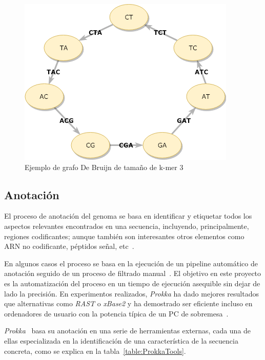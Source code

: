 \begin{figure}
    \begin{center}
      \includegraphics[scale=0.5]{images/DeBruijnGraph.png}
      \caption{Ejemplo de grafo De Bruijn de tamaño de  k-mer 3}
      \label{fig:DeBruijn}
    \end{center}
\end{figure}

\subsection{Anotación}
El proceso de anotación del genoma se basa en identificar y etiquetar todos los aspectos relevantes encontrados en una secuencia, incluyendo, principalmente, regiones codificantes; aunque también son interesantes otros elementos como ARN no codificante, péptidos señal, etc~\cite{RichardsonWatson2012}. 

En algunos casos el proceso se basa en la ejecución de un pipeline automático de anotación seguido de un proceso de filtrado manual~\cite{Stothard2006}. El objetivo en este proyecto es la automatización del proceso en un tiempo de ejecución asequible sin dejar de lado la precisión. En experimentos realizados, \textit{Prokka} ha dado mejores resultados que alternativas como \textit{RAST} o \textit{xBase2} y ha demostrado ser eficiente incluso en ordenadores de usuario con la potencia típica de un PC de sobremesa~\cite{Seemann2014}.

\textit{Prokka}~\cite{Seemann2014} basa su anotación en una serie de herramientas  externas, cada una de ellas especializada en la identificación de una característica de la secuencia concreta, como se explica en la tabla~\ref{table:ProkkaTools}.

